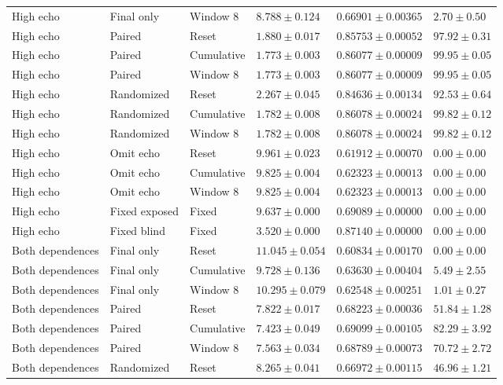 \begin{longtable}{@{}llllll@{}}
High echo & Final only & Window 8 & $8.788 \pm 0.124$ & $0.66901 \pm 0.00365$ & $2.70 \pm 0.50$ \\
High echo & Paired & Reset & $1.880 \pm 0.017$ & $0.85753 \pm 0.00052$ & $97.92 \pm 0.31$ \\
High echo & Paired & Cumulative & $1.773 \pm 0.003$ & $0.86077 \pm 0.00009$ & $99.95 \pm 0.05$ \\
High echo & Paired & Window 8 & $1.773 \pm 0.003$ & $0.86077 \pm 0.00009$ & $99.95 \pm 0.05$ \\
High echo & Randomized & Reset & $2.267 \pm 0.045$ & $0.84636 \pm 0.00134$ & $92.53 \pm 0.64$ \\
High echo & Randomized & Cumulative & $1.782 \pm 0.008$ & $0.86078 \pm 0.00024$ & $99.82 \pm 0.12$ \\
High echo & Randomized & Window 8 & $1.782 \pm 0.008$ & $0.86078 \pm 0.00024$ & $99.82 \pm 0.12$ \\
High echo & Omit echo & Reset & $9.961 \pm 0.023$ & $0.61912 \pm 0.00070$ & $0.00 \pm 0.00$ \\
High echo & Omit echo & Cumulative & $9.825 \pm 0.004$ & $0.62323 \pm 0.00013$ & $0.00 \pm 0.00$ \\
High echo & Omit echo & Window 8 & $9.825 \pm 0.004$ & $0.62323 \pm 0.00013$ & $0.00 \pm 0.00$ \\
High echo & Fixed exposed & Fixed & $9.637 \pm 0.000$ & $0.69089 \pm 0.00000$ & $0.00 \pm 0.00$ \\
High echo & Fixed blind & Fixed & $3.520 \pm 0.000$ & $0.87140 \pm 0.00000$ & $0.00 \pm 0.00$ \\
Both dependences & Final only & Reset & $11.045 \pm 0.054$ & $0.60834 \pm 0.00170$ & $0.00 \pm 0.00$ \\
Both dependences & Final only & Cumulative & $9.728 \pm 0.136$ & $0.63630 \pm 0.00404$ & $5.49 \pm 2.55$ \\
Both dependences & Final only & Window 8 & $10.295 \pm 0.079$ & $0.62548 \pm 0.00251$ & $1.01 \pm 0.27$ \\
Both dependences & Paired & Reset & $7.822 \pm 0.017$ & $0.68223 \pm 0.00036$ & $51.84 \pm 1.28$ \\
Both dependences & Paired & Cumulative & $7.423 \pm 0.049$ & $0.69099 \pm 0.00105$ & $82.29 \pm 3.92$ \\
Both dependences & Paired & Window 8 & $7.563 \pm 0.034$ & $0.68789 \pm 0.00073$ & $70.72 \pm 2.72$ \\
Both dependences & Randomized & Reset & $8.265 \pm 0.041$ & $0.66972 \pm 0.00115$ & $46.96 \pm 1.21$ \\

\end{longtable}

